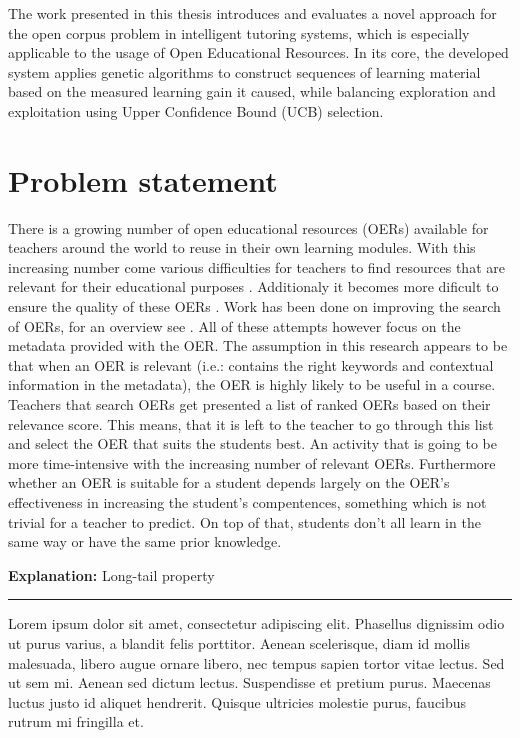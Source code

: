 The work presented in this thesis introduces and evaluates a novel approach for
the open corpus problem in intelligent tutoring systems, which is especially
applicable to the usage of Open Educational Resources.
In its core, the developed system applies genetic algorithms to construct
sequences of learning material based on the measured learning gain it caused,
while balancing exploration and exploitation using Upper Confidence Bound (UCB)
selection.


\section{Problem statement}
There is a growing number of open educational resources (OERs) available for
teachers around the world to reuse in their own learning modules. With this
increasing number come various difficulties for teachers to find resources that
are relevant for their educational purposes \citep{Ochoa2011}. Additionaly it
becomes more dificult to ensure the quality of these OERs \citep{Cechinel2011}.
Work has been done on improving the search of OERs, for an overview see
\citep{Ochoa2008}. All of these attempts however focus on the metadata provided
with the OER. The assumption in this research appears to be that when an OER is
relevant (i.e.: contains the right keywords and contextual information in the
metadata), the OER is highly likely to be useful in a course. Teachers that
search OERs get presented a list of ranked OERs based on their relevance score.
This means, that it is left to the teacher to go through this list and select
the OER that suits the students best. An activity that is going to be more
time-intensive with the increasing number of relevant OERs. Furthermore whether
an OER is suitable for a student depends largely on the OER’s effectiveness in
increasing the student’s compentences, something which is not trivial for a
teacher to predict. On top of that, students don't all learn in the same way or
have the same prior knowledge.

\begin{shaded}
\textbf{{\large Explanation:}} Long-tail property \vspace{0.5\onelineskip} \hrule
\vspace{\baselineskip}
Lorem ipsum dolor sit amet, consectetur adipiscing elit. Phasellus dignissim odio ut purus varius, a blandit felis porttitor. Aenean scelerisque, diam id mollis malesuada, libero augue ornare libero, nec tempus sapien tortor vitae lectus. Sed ut sem mi. Aenean sed dictum lectus. Suspendisse et pretium purus. Maecenas luctus justo id aliquet hendrerit. Quisque ultricies molestie purus, faucibus rutrum mi fringilla et.
\end{shaded}

